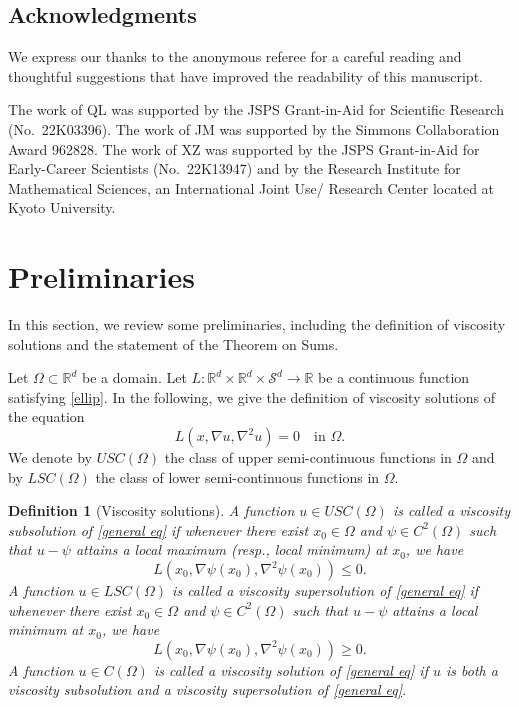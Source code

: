 \documentclass[12pt, reqno]{amsart}
\newtheorem{definition}{Definition}%
\newcommand{\R}{\mathbb{R}}
\def\Om{\Omega}
\def\R{{\mathbb R}}
\def\L{{\mathcal L}}
\def\S{{\mathcal S}}
\begin{document}
\subsection*{Acknowledgments}
We express our thanks to the anonymous referee for a careful reading and thoughtful suggestions that have improved the readability of this manuscript.

The work of QL was supported by the JSPS Grant-in-Aid for Scientific Research (No.~22K03396). The work of JM was supported by the Simmons Collaboration Award 962828. The work of XZ was supported by the JSPS Grant-in-Aid for Early-Career Scientists (No.~22K13947) and by the Research Institute for Mathematical Sciences, an International Joint Use/ Research Center located at Kyoto University. 


\section{Preliminaries}
In this section, we review some preliminaries, including the definition of viscosity solutions and the statement of the Theorem on Sums. 


Let $\Omega\subset \R^d$ be a domain.
Let $L: \R^d \times \R^d\times \S^d\to \R$ be a continuous function satisfying \eqref{ellip}. 
In the following, we give the definition of viscosity solutions of the equation 
\begin{equation}\label{general eq}
    L(x, \nabla u, \nabla^2 u)=0 \quad \text{in $\Omega$}. 
\end{equation}
We denote by $USC(\Omega)$ the class of upper semi-continuous functions in $\Omega$ and by $LSC(\Omega)$ the class of lower semi-continuous functions in $\Omega$.
\begin{definition}[Viscosity solutions]\label{def-vis}
A function $u\in USC(\Om)$ is called a \emph{viscosity subsolution} of \eqref{general eq} if whenever there exist $x_0\in \Om$ and $\psi\in C^2(\Om)$ such that $u-\psi$ attains a local maximum (resp., local minimum) at $x_0$, we have 
\[
L(x_0, \nabla \psi(x_0), \nabla^2 \psi(x_0))\leq 0.
\]
A function $u\in LSC(\Om)$ is called a \emph{viscosity supersolution} of \eqref{general eq} if whenever there exist $x_0\in \Om$ and $\psi\in C^2(\Om)$ such that $u-\psi$ attains a local minimum at $x_0$, we have 
\[
L(x_0, \nabla \psi(x_0), \nabla^2 \psi(x_0))\geq 0.
\]
A function $u\in C(\Om)$ %
is called a \emph{viscosity solution} of \eqref{general eq} if $u$ is both a viscosity subsolution and a viscosity supersolution of \eqref{general eq}. 
\end{definition}
\end{document}
